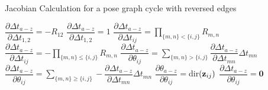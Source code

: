 \begin{algorithm}[H]
  \caption{Jacobian Calculation for a pose graph cycle with reversed edges}\label{algo:reversed}
  \begin{algorithmic}[1]
      \State $\dfrac{\partial \Delta t_{a-z}}{\partial \Delta t_{1,2}} = -R_{12}$
    \Else
      \State $\dfrac{\partial \Delta t_{a-z}}{\partial \Delta t_{1,2}} = 1$
    \EndIf
        \State $\dfrac{\partial \Delta t_{a-z}}{\partial \Delta t_{ij}} = \prod_{\{m,n\} < \{i,j\}} R_{m,n}$
      \Else
        \State $\dfrac{\partial \Delta t_{a-z}}{\partial \Delta t_{ij}} = -\prod_{\{m,n\} \leq \{i,j\}} R_{m,n}$
      \EndIf
    \EndFor
        \State $\dfrac{\partial \Delta t_{a-z}}{\partial \theta_{ij}} = \sum_{\{m,n\} > \{i,j\}} \dfrac{\partial \Delta t_{a-z}}{\partial \Delta t_{mn}} \Delta t_{mn}$
      \Else
        \State $\dfrac{\partial \Delta t_{a-z}}{\partial \theta_{ij}} =
        \sum_{\{m,n\} \geq \{i,j\}} -\dfrac{\partial \Delta t_{a-z}}{\partial \Delta t_{mn}} \Delta t_{mn}$
      \EndIf
      \State $\dfrac{\partial \theta_{a-z}}{\partial \theta_{ij}} = $dir$\left( \mathbf{z}_{ij} \right)$
      \State $\dfrac{\partial \Delta t_{a-z}}{\partial \theta_{ij}} = \textbf{0}$
    \EndFor
  \end{algorithmic}
\end{algorithm}


